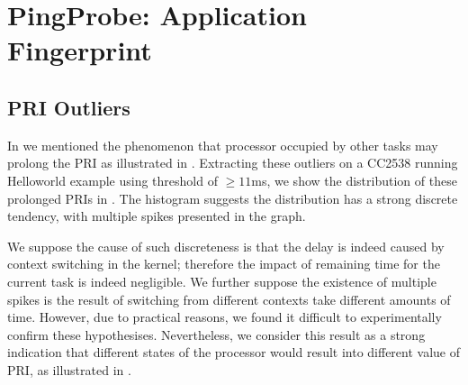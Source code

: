 \section{PingProbe: Application Fingerprint} \label{PingProbe}
\subsection{PRI Outliers}
In   we mentioned the phenomenon that processor occupied by other tasks may prolong the PRI as illustrated in  . Extracting these outliers on a CC2538 running Helloworld example using threshold of $\geq 11$ms, we show the distribution of these prolonged PRIs in . The histogram suggests the distribution has a strong discrete tendency, with multiple spikes presented in the graph.


We suppose the cause of such discreteness is that the delay is indeed caused by context switching in the kernel; therefore the impact of remaining time for the current task is indeed negligible. We further suppose the existence of multiple spikes is the result of switching from different contexts take different amounts of time. However, due to practical reasons, we found it difficult to experimentally confirm these hypothesises. Nevertheless, we consider this result as a strong indication that different states of the processor would result into different value of PRI, as illustrated in .

